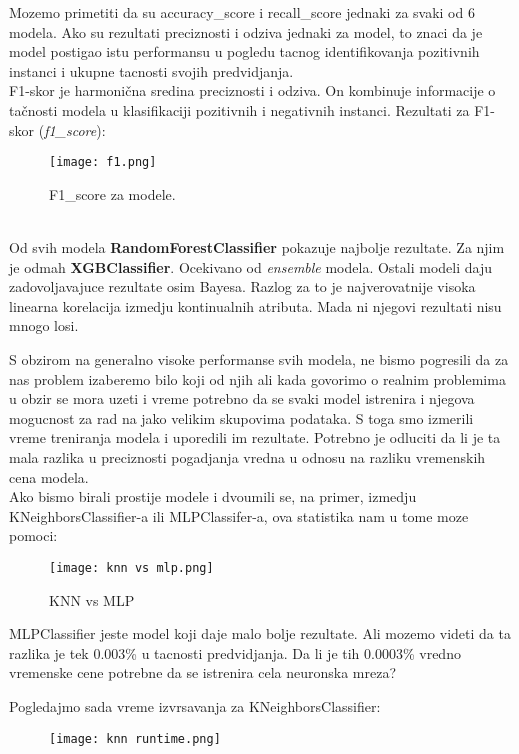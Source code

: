 \documentclass[10pt]{article}
\begin{document}
Mozemo primetiti da su accuracy\_score i recall\_score jednaki za svaki od 6 modela. Ako su rezultati preciznosti i odziva jednaki za model, to znaci da je model postigao istu performansu u pogledu tacnog identifikovanja pozitivnih instanci i ukupne tacnosti svojih predvidjanja.\\

F1-skor je harmonična sredina preciznosti i odziva. On kombinuje informacije o tačnosti modela u klasifikaciji pozitivnih i negativnih instanci. Rezultati za F1-skor (\textit{f1\_score}):
\begin{figure}[h]
    \centering
    \texttt{[image: f1.png]}
    \caption{F1\_score za modele.}
    \label{Slika4}
\end{figure}
\\

Od svih modela \textbf{RandomForestClassifier} pokazuje najbolje rezultate. Za njim je odmah \textbf{XGBClassifier}. Ocekivano od \textit{ensemble} modela. Ostali modeli daju zadovoljavajuce rezultate
osim Bayesa. Razlog za to je najverovatnije visoka linearna korelacija izmedju kontinualnih atributa. Mada ni njegovi rezultati nisu mnogo losi.\pagebreak

S obzirom na generalno visoke performanse svih modela, ne bismo pogresili da za nas problem izaberemo bilo koji od njih ali kada govorimo o realnim problemima u obzir se mora uzeti i vreme potrebno da se svaki model istrenira i njegova mogucnost za rad na jako velikim skupovima podataka. S toga smo izmerili vreme treniranja modela i uporedili im rezultate. Potrebno je odluciti da li je ta mala razlika u preciznosti pogadjanja vredna u odnosu na razliku vremenskih cena modela.\\

Ako bismo birali prostije modele i dvoumili se, na primer, izmedju KNeighborsClassifier-a ili MLPClassifer-a, ova statistika nam u tome moze pomoci: 
\begin{figure}[h]
    \centering
    \texttt{[image: knn vs mlp.png]}
    \caption{KNN vs MLP}
    \label{Slika5}
\end{figure}

MLPClassifier jeste model koji daje malo bolje rezultate. Ali mozemo videti da ta razlika je tek 0.003\% u tacnosti predvidjanja. Da li je tih 0.0003\% vredno vremenske cene potrebne da se istrenira cela neuronska mreza? 

\pagebreak
Pogledajmo sada vreme izvrsavanja za KNeighborsClassifier:
\begin{figure}[h]
    \centering
    \texttt{[image: knn runtime.png]}
    \label{Slika6}
\end{figure}
\end{document}
